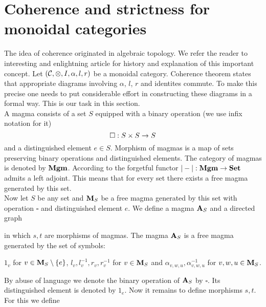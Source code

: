\section{Coherence and strictness for monoidal categories}
\noindent
The idea of coherence originated in algebraic topology. We refer the reader to interesting and enlightning article \cite{maclane1963natural} for history and explanation of this important concept. Let $({\mathcal C},\otimes, I,\alpha, l, r)$ be a monoidal category. Coherence theorem states that appropriate diagrams involving $\alpha$, $l$, $r$ and identites commute. To make this precise one needs to put considerable effort in constructing these diagrams in a formal way. This is our task in this section.\\
A magma consists of a set $S$ equipped with a binary operation (we use infix notation for it)
$$\square:S\times S\rightarrow S$$
and a distinguished element $e\in S$. Morphism of magmas is a map of sets preserving binary operations and distinguished elements. The category of magmas is denoted by $\mathbf{Mgm}$. According to {\cite[Corollary 3.7.8]{borceux1994handbook}} the forgetful functor $|-|:\mathbf{Mgm}\rightarrow \mathbf{Set}$ admits a left adjoint. This means that for every set there exists a free magma generated by this set.\\
Now let $S$ be any set and $\mathbf{M}_S$ be a free magma generated by this set with operation $\square$ and distinguished element $e$. We define a magma $\mathbf{A}_S$ and a directed graph
\begin{center}
\end{center}
in which $s, t$ are morphisms of magmas. The magma $\mathbf{A}_S$ is a free magma generated by the set of symbols:
\begin{center}
$1_v$ for $v\in \mathbf{M}_S\setminus \{e\}$, $l_v,l^{-1}_v,r_v,r^{-1}_v$ for $v\in \mathbf{M}_S$ and $\alpha_{v,w,u},\alpha^{-1}_{v,w,u}$ for $v,w,u\in \mathbf{M}_S$.
\end{center}
By abuse of language we denote the binary operation of $\mathbf{A}_S$ by $\square$. Its distinguished element is denoted by $1_e$. Now it remains to define morphisms $s,t$. For this we define
